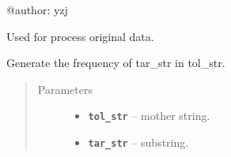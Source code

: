 \documentclass[letterpaper,10pt,english]{sphinxmanual}
\begin{document}
@author: yzj

\begin{fulllineitems}
\label{reference/PyDNAutil:PyDNAutil.ALPHABET}
Used for process original data.

\end{fulllineitems}


\begin{fulllineitems}
\label{reference/PyDNAutil:PyDNAutil.ConvertPhycheIndexToDict}
\end{fulllineitems}


\begin{fulllineitems}
\label{reference/PyDNAutil:PyDNAutil.DNAChecks}
\end{fulllineitems}


\begin{fulllineitems}
\label{reference/PyDNAutil:PyDNAutil.Frequency}
Generate the frequency of tar\_str in tol\_str.
\begin{quote}\begin{description}
\item[{Parameters}] \leavevmode\begin{itemize}
\item {} 
\textbf{\texttt{tol\_str}} -- mother string.

\item {} 
\textbf{\texttt{tar\_str}} -- substring.

\end{itemize}

\end{description}\end{quote}

\end{fulllineitems}

\end{document}
